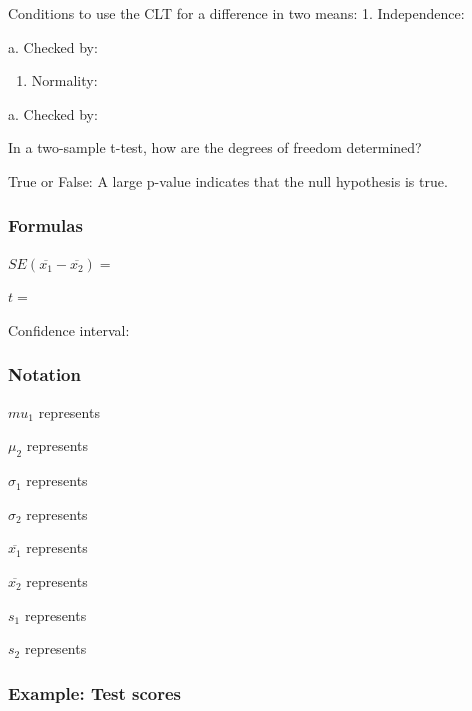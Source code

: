 \documentclass[
]{report}
\providecommand{\tightlist}{%
  \setlength{\itemsep}{0pt}\setlength{\parskip}{0pt}}
\newcommand{\rgs}{\vspace{12pt}} %
\newcommand{\rgi}{\hspace{24pt}}  %
\begin{document}
Conditions to use the CLT for a difference in two means:
1. Independence:
\rgs

\rgi a. Checked by:
\rgs

\begin{enumerate}
\def\labelenumi{\arabic{enumi}.}
\setcounter{enumi}{1}
\tightlist
\item
  Normality:
  \rgs
\end{enumerate}

\rgi a. Checked by:
\rgs

In a two-sample t-test, how are the degrees of freedom determined?
\rgs        

True or False: A large p-value indicates that the null hypothesis is true.
\rgs

\hypertarget{formulas-10}{%
\subsubsection*{Formulas}\label{formulas-10}}

\(SE(\overline{x_1} - \overline{x_2})=\)
\rgs

\(t=\)
\rgs

Confidence interval:
\rgs

\hypertarget{notation-3}{%
\subsubsection*{Notation}\label{notation-3}}

\(mu_1\) represents
\rgs

\(\mu_2\) represents
\rgs

\(\sigma_1\) represents
\rgs

\(\sigma_2\) represents
\rgs

\(\overline{x_1}\) represents
\rgs

\(\overline{x_2}\) represents
\rgs

\(s_1\) represents
\rgs

\(s_2\) represents
\rgs

\hypertarget{example-test-scores}{%
\subsubsection*{Example: Test scores}\label{example-test-scores}}
\end{document}

